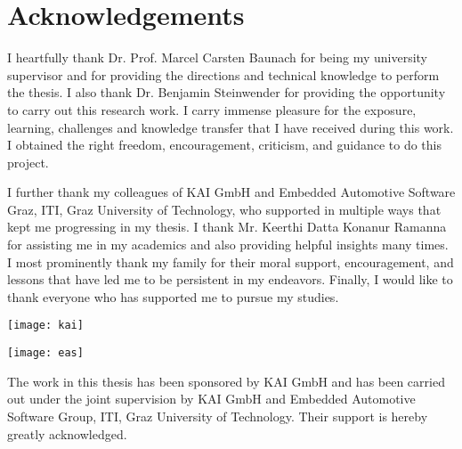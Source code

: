 \chapter*{Acknowledgements}


I heartfully thank Dr. Prof. Marcel Carsten Baunach for being my university supervisor and for providing the directions and technical knowledge to perform the thesis.
I also thank Dr. Benjamin Steinwender for providing the opportunity to carry out this research work.
I carry immense pleasure for the exposure, learning, challenges and knowledge transfer that I have received during this work.
I obtained the right freedom, encouragement, criticism, and guidance to do this project.

I further thank my colleagues of KAI GmbH and Embedded Automotive Software Graz, ITI, Graz University of Technology, who supported in multiple ways that kept me progressing in my thesis.
I thank Mr. Keerthi Datta Konanur Ramanna for assisting me in my academics and also providing helpful insights many times.
I most prominently thank my family for their moral support, encouragement, and lessons that have led me to be persistent in my endeavors.
Finally, I would like to thank everyone who has supported me to pursue my studies.    

  
\texttt{[image: kai]}

\texttt{[image: eas]}



The work in this thesis has been sponsored by KAI GmbH and has been carried out under the joint supervision by KAI GmbH and Embedded Automotive Software Group, ITI, Graz University of Technology.
Their support is hereby greatly acknowledged.
